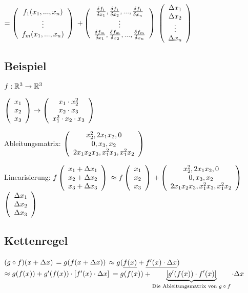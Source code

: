 $=   \left(  \begin{array}{c} f_1(x_1,...,x_n)\\\vdots\\f_m(x_1,...,x_n) \end{array}  \right)   $
$+   \left(  \begin{array}{c} \frac{\delta f_1}{\delta x_1}, \frac{\delta f_1}{\delta x_2}, ..., \frac{\delta f_1}{\delta x_n}\\ \vdots\\\frac{\delta f_m}{\delta x_1}, \frac{\delta f_m}{\delta x_2}, ..., \frac{\delta f_m}{\delta x_n} \end{array}  \right)  $
$  \left(  \begin{array}{c} \Delta x_1\\\Delta x_2\\\vdots\\\Delta x_n \end{array}  \right)  $ 

\subsection{Beispiel}
$f : \mathbb{R}^3 \rightarrow \mathbb{R}^3$

$  \left(  \begin{array}{c} x_1\\x_2\\x_3 \end{array}  \right)   \rightarrow   \left(  \begin{array}{c} x_1 \cdot x_2^2\\ x_2 \cdot x_3 \\ x_1^2 \cdot x_2 \cdot x_3 \end{array}  \right)  $

Ableitungsmatrix: 
$  \left(  \begin{array}{c} x_2^2, 2x_1 x_2, 0\\ 0, x_3, x_2\\2 x_1 x_2 x_3, x_1^2 x_3, x_1^2 x_2 \end{array}  \right)  $

Linearisierung: 
$f   \left(  \begin{array}{c} x_1 + \Delta x_1\\ x_2 + \Delta x_2\\ x_3 + \Delta x_3 \end{array}  \right)  $
$\approx f  \left(  \begin{array}{c} x_1\\ x_2 \\ x_3	 \end{array}  \right)  $
$+  \left(  \begin{array}{c} x_2^2, 2x_1 x_2, 0\\ 0, x_3, x_2\\2 x_1 x_2 x_3, x_1^2 x_3, x_1^2 x_2 \end{array}  \right)  $
$  \left(  \begin{array}{c} \Delta x_1\\ \Delta x_2\\ \Delta x_3 \end{array}  \right)  $

\subsection{Kettenregel}
$ (g\circ f) (x+\Delta x) $
$=g(f(x+\Delta x))$
$\approx g(\underline{f(x)} + \underline{f'(x) \cdot \Delta x})$
$\approx g(f(x)) + g'(f(x)) \cdot [f'(x) \cdot \Delta x]$
$= g(f(x)) + \underbrace{[g'(f(x)) \cdot f'(x)]}_{\textrm{Die Ableitungsmatrix von $g\circ f$}} \cdot \Delta x$

